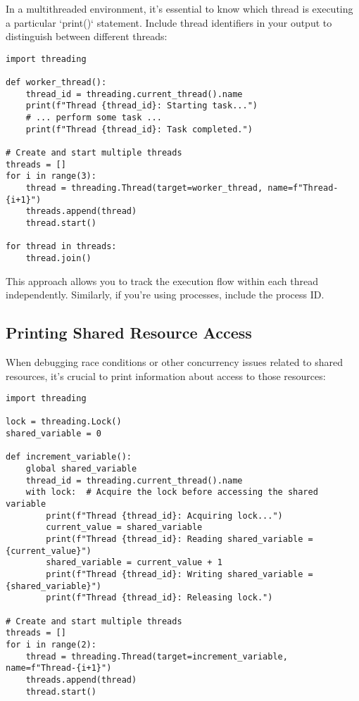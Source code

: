 \documentclass{article}
\begin{document}
{{{In a multithreaded environment, it's essential to know which thread is executing a particular `print()` statement. Include thread identifiers in your output to distinguish between different threads:

\begin{verbatim}
import threading

def worker_thread():
    thread_id = threading.current_thread().name
    print(f"Thread {thread_id}: Starting task...")
    # ... perform some task ...
    print(f"Thread {thread_id}: Task completed.")

# Create and start multiple threads
threads = []
for i in range(3):
    thread = threading.Thread(target=worker_thread, name=f"Thread-{i+1}")
    threads.append(thread)
    thread.start()

for thread in threads:
    thread.join()
\end{verbatim}

This approach allows you to track the execution flow within each thread independently. Similarly, if you're using processes, include the process ID.

\subsection*{Printing Shared Resource Access}

When debugging race conditions or other concurrency issues related to shared resources, it's crucial to print information about access to those resources:

\begin{verbatim}
import threading

lock = threading.Lock()
shared_variable = 0

def increment_variable():
    global shared_variable
    thread_id = threading.current_thread().name
    with lock:  # Acquire the lock before accessing the shared variable
        print(f"Thread {thread_id}: Acquiring lock...")
        current_value = shared_variable
        print(f"Thread {thread_id}: Reading shared_variable = {current_value}")
        shared_variable = current_value + 1
        print(f"Thread {thread_id}: Writing shared_variable = {shared_variable}")
        print(f"Thread {thread_id}: Releasing lock.")

# Create and start multiple threads
threads = []
for i in range(2):
    thread = threading.Thread(target=increment_variable, name=f"Thread-{i+1}")
    threads.append(thread)
    thread.start()


\end{verbatim}}}}
\end{document}
